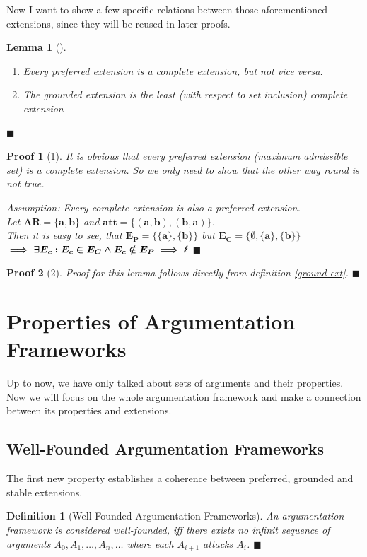 \documentclass[12pt]{report}
\numberwithin{figure}{chapter}
\theoremstyle{break}
\newtheorem{defn}{Definition}[chapter]
\newtheorem{lem}{Lemma}[chapter]
\newtheorem*{prf}{Proof}
\newenvironment{mydefn}{\begin{defn}}{$\blacksquare$ \end{defn}}
\newenvironment{mylem}{\begin{lem}}{$\blacksquare$ \end{lem}}
\newenvironment{myprf}{\begin{prf}}{$\blacksquare$ \end{prf}}
\begin{document}
\newpage

Now I want to show a few specific relations between those aforementioned extensions, since they will be reused in later proofs.

\begin{mylem}[\cite{Dung}]
\leavevmode\vspace{-\baselineskip}
\begin{enumerate}
	\item{Every preferred extension is a complete extension, but not vice versa.}
	\item{The grounded extension is the least (with respect to set inclusion) complete extension}
\end{enumerate}
\end{mylem}

\begin{myprf}[1]
It is obvious that every preferred extension (maximum admissible set) is a complete extension. So we only need to show that the other way round is not true.

Assumption: Every complete extension is also a preferred extension.\\
Let $\bm{AR=\{a,b\}}$ and $\bm{att=\{(a,b),(b,a)\}}$.\\
Then it is easy to see, that $\bm{E_{P}=\{\{a\},\{b\}\}}$ but $\bm{E_{C}=\{\emptyset,\{a\},\{b\}\}}$\\
$\bm{\implies \exists E_{c}: E_{c} \in E_{C} \land E_{c} \notin E_{P} \implies \text{\Lightning}}$
\end{myprf}

\begin{myprf}[2]
Proof for this lemma follows directly from definition \ref{ground ext}.
\end{myprf}

\section{Properties of Argumentation Frameworks}
Up to now, we have only talked about sets of arguments and their properties. Now we will focus on the whole argumentation framework and 
make a connection between its properties and extensions.

\subsection{Well-Founded Argumentation Frameworks}
The first new property establishes a coherence between preferred, grounded and stable extensions.
\begin{mydefn}[Well-Founded Argumentation Frameworks]
An argumentation framework is considered well-founded, iff there exists no infinit sequence of arguments $A_{0},A_{1},\dots,A_{n},\dots$ where each $A_{i+1}$ attacks $A_{i}$.
\end{mydefn}
\end{document}
